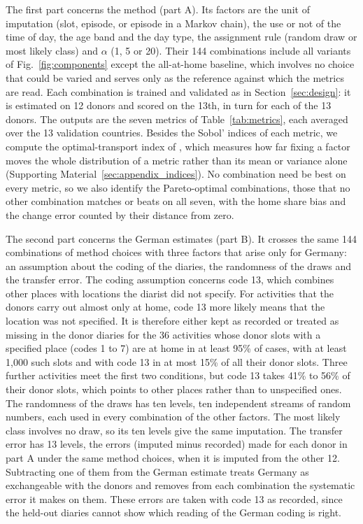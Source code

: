 \documentclass[a4paper]{article}
\begin{document}
The first part concerns the method (part A). Its factors are the unit of imputation (slot, episode, or episode in a Markov chain), the use or not of the time of day, the age band and the day type, the assignment rule (random draw or most likely class) and $\alpha$ (1, 5 or 20). Their 144 combinations include all variants of Fig.~\ref{fig:components} except the all-at-home baseline, which involves no choice that could be varied and serves only as the reference against which the metrics are read. Each combination is trained and validated as in Section~\ref{sec:design}: it is estimated on 12 donors and scored on the 13th, in turn for each of the 13 donors. The outputs are the seven metrics of Table~\ref{tab:metrics}, each averaged over the 13 validation countries. Besides the Sobol' indices of each metric, we compute the optimal-transport index of \textcite{borgonovoGlobalSensitivityAnalysis2025}, which measures how far fixing a factor moves the whole distribution of a metric rather than its mean or variance alone (Supporting Material~\ref{sec:appendix_indices}). No combination need be best on every metric, so we also identify the Pareto-optimal combinations, those that no other combination matches or beats on all seven, with the home share bias and the change error counted by their distance from zero.

The second part concerns the German estimates (part B). It crosses the same 144 combinations of method choices with three factors that arise only for Germany: an assumption about the coding of the diaries, the randomness of the draws and the transfer error. The coding assumption concerns code 13, which combines other places with locations the diarist did not specify. For activities that the donors carry out almost only at home, code 13 more likely means that the location was not specified. It is therefore either kept as recorded or treated as missing in the donor diaries for the 36 activities whose donor slots with a specified place (codes 1 to 7) are at home in at least 95\% of cases, with at least 1,000 such slots and with code 13 in at most 15\% of all their donor slots. Three further activities meet the first two conditions, but code 13 takes 41\% to 56\% of their donor slots, which points to other places rather than to unspecified ones. The randomness of the draws has ten levels, ten independent streams of random numbers, each used in every combination of the other factors. The most likely class involves no draw, so its ten levels give the same imputation. The transfer error has 13 levels, the errors (imputed minus recorded) made for each donor in part A under the same method choices, when it is imputed from the other 12. Subtracting one of them from the German estimate treats Germany as exchangeable with the donors and removes from each combination the systematic error it makes on them. These errors are taken with code 13 as recorded, since the held-out diaries cannot show which reading of the German coding is right.
\end{document}

